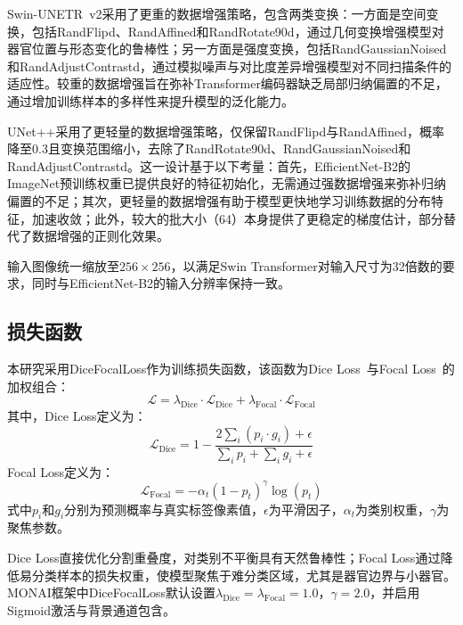 \documentclass[12pt, a4paper]{article}
\newcommand{\mrm}[1]{\mathrm{#1}}
\newcommand{\Dice}{\mrm{Dice}}
\newcommand{\Focal}{\mrm{Focal}}
\begin{document}
Swin-UNETR~v2采用了更重的数据增强策略，包含两类变换：一方面是空间变换，包括RandFlipd、RandAffined和RandRotate90d，通过几何变换增强模型对器官位置与形态变化的鲁棒性；另一方面是强度变换，包括RandGaussianNoised和RandAdjustContrastd，通过模拟噪声与对比度差异增强模型对不同扫描条件的适应性。较重的数据增强旨在弥补Transformer编码器缺乏局部归纳偏置的不足，通过增加训练样本的多样性来提升模型的泛化能力。

UNet++采用了更轻量的数据增强策略，仅保留RandFlipd与RandAffined，概率降至0.3且变换范围缩小，去除了RandRotate90d、RandGaussianNoised和RandAdjustContrastd。这一设计基于以下考量：首先，EfficientNet-B2的ImageNet预训练权重已提供良好的特征初始化，无需通过强数据增强来弥补归纳偏置的不足；其次，更轻量的数据增强有助于模型更快地学习训练数据的分布特征，加速收敛；此外，较大的批大小（64）本身提供了更稳定的梯度估计，部分替代了数据增强的正则化效果。

输入图像统一缩放至$256{\times}256$，以满足Swin Transformer对输入尺寸为32倍数的要求，同时与EfficientNet-B2的输入分辨率保持一致。

\subsection{损失函数}
\label{sec:loss}

本研究采用DiceFocalLoss作为训练损失函数，该函数为Dice Loss~\cite{milletari2016v}与Focal Loss~\cite{lin2017focal}的加权组合：
\begin{equation}
    \mathcal{L} = \lambda_{\Dice} \cdot \mathcal{L}_{\Dice} + \lambda_{\Focal} \cdot \mathcal{L}_{\Focal}
    \label{eq:loss}
\end{equation}
其中，Dice Loss定义为：
\begin{equation}
    \mathcal{L}_{\Dice} = 1 - \frac{2\sum_{i}(p_i \cdot g_i) + \epsilon}{\sum_{i}p_i + \sum_{i}g_i + \epsilon}
    \label{eq:dice_loss}
\end{equation}
Focal Loss定义为：
\begin{equation}
    \mathcal{L}_{\Focal} = -\alpha_t (1 - p_t)^{\gamma} \log(p_t)
    \label{eq:focal_loss}
\end{equation}
式中$p_i$和$g_i$分别为预测概率与真实标签像素值，$\epsilon$为平滑因子，$\alpha_t$为类别权重，$\gamma$为聚焦参数。

Dice Loss直接优化分割重叠度，对类别不平衡具有天然鲁棒性；Focal Loss通过降低易分类样本的损失权重，使模型聚焦于难分类区域，尤其是器官边界与小器官。MONAI框架中DiceFocalLoss默认设置$\lambda_{\Dice}=\lambda_{\Focal}=1.0$，$\gamma=2.0$，并启用Sigmoid激活与背景通道包含。
\end{document}
